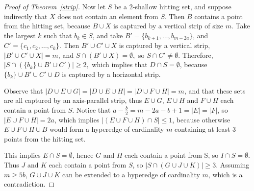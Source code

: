 \documentclass[10pt,a4paper]{amsart}
\newcommand{\est}{\emptyset}
\begin{document}
\begin{proof}[Proof of Theorem~\ref{strip}]
Now let $S$ be a 2-shallow hitting set, and suppose indirectly that $X$ does not contain an element from $S$. Then $B$ contains a point from the hitting set, because $B\cup X$ is captured by a vertical strip of size $m$. Take the largest $k$ such that $b_{k}\in S$, and take $B'=\{b_{k+1},\ldots,b_{m-2a}\}$, and $C'=\{c_1,c_2,\ldots,c_k\}$. Then $B'\cup C'\cup X$ is captured by a vertical strip, $|B'\cup C'\cup X|=m$, and $S\cap(B'\cup X)=\emptyset,$ so $S\cap C'\ne \emptyset$. Therefore, $|S\cap(\{b_k\}\cup B'\cup C')|\ge 2,$ which implies that $D\cap S=\emptyset$, because $\{b_k\}\cup B'\cup C'\cup D$ is captured by a horizontal strip.

Observe that $|D\cup E\cup G|=|D\cup E\cup H|=|D\cup F\cup H|=m$, and that these sets are all captured by an axis-parallel strip, thus $E \cup G$, $E \cup H$ and $F \cup H$ each contain a point from $S$. Notice that $a-\frac{b}{2}=m-2a-b+1=|E|=|F|$, so $|E\cup F\cup H|=2a$, which implies $\big|(E\cup F\cup H)\cap S\big|\le 1$, because otherwise $E \cup F \cup H \cup B$ would form a hyperedge of cardinality $m$ containing at least 3 points from the hitting set.



 This implies $E\cap S=\emptyset$, hence $G$ and $H$ each contain a point from S, so $I\cap S=\est$. Thus $J$ and $K$ each contain a point from $S$, so $|S\cap(G\cup J\cup K)|\ge3.$ Assuming $m\ge 5b$, $G\cup J\cup K$ can be extended to a hyperedge of cardinality $m$, which is a contradiction.
\end{proof}
\end{document}
